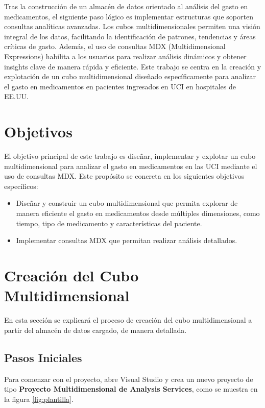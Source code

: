 \documentclass{article}
\begin{document}
Tras la construcción de un almacén de datos orientado al análisis del gasto en medicamentos, el siguiente paso lógico es implementar estructuras que soporten consultas analíticas avanzadas. Los cubos multidimensionales permiten una visión integral de los datos, facilitando la identificación de patrones, tendencias y áreas críticas de gasto. Además, el uso de consultas MDX (Multidimensional Expressions) habilita a los usuarios para realizar análisis dinámicos y obtener insights clave de manera rápida y eficiente. Este trabajo se centra en la creación y explotación de un cubo multidimensional diseñado específicamente para analizar el gasto en medicamentos en pacientes ingresados en UCI en hospitales de EE.UU. \cite{eicu_crd}

\section{Objetivos}
\label{sec:objetivos}

El objetivo principal de este trabajo es diseñar, implementar y explotar un cubo multidimensional para analizar el gasto en medicamentos en las UCI mediante el uso de consultas MDX. Este propósito se concreta en los siguientes objetivos específicos:

\begin{itemize}
	\item Diseñar y construir un cubo multidimensional que permita explorar de manera eficiente el gasto en medicamentos desde múltiples dimensiones, como tiempo, tipo de medicamento y características del paciente.
	\item Implementar consultas MDX que permitan realizar análisis detallados.

\end{itemize}










\section{Creación del Cubo Multidimensional}
En esta sección se explicará el proceso de creación del cubo multidimensional a partir del almacén de datos cargado, de manera detallada.

\subsection{Pasos Iniciales}
Para comenzar con el proyecto, abre Visual Studio y crea un nuevo proyecto de tipo \textbf{Proyecto Multidimensional de Analysis Services}, como se muestra en la figura \ref{fig:plantilla}.
\end{document}
